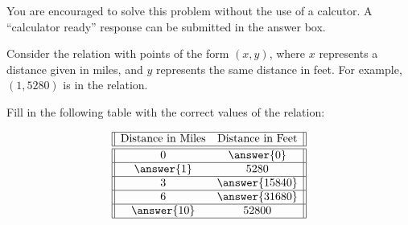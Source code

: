 \documentclass{ximera}
\author{Kenneth Berglund}
\begin{document}
You are encouraged to solve this problem without the use of a calcutor. A ``calculator ready'' response can be submitted in the answer box.
\begin{exercise}
Consider the relation with points of the form $(x, y)$, where $x$ represents a distance given in miles, and $y$ represents the same distance in feet. For example, $(1, 5280)$ is in the relation. 

Fill in the following table with the correct values of the relation:

\[
 \begin{array}{||c c||} 
 \hline
 \text{Distance in Miles} & \text{Distance in Feet} \\
 \hline\hline
 0 & \answer{0}\\ 
 \hline
 \answer{1} & 5280 \\
 \hline
 3 & \answer{15840}\\
 \hline
 6 & \answer{31680} \\
 \hline
 \answer{10} & 52800 \\ 
 \hline
\end{array}
\]



\end{exercise}
\end{document}
